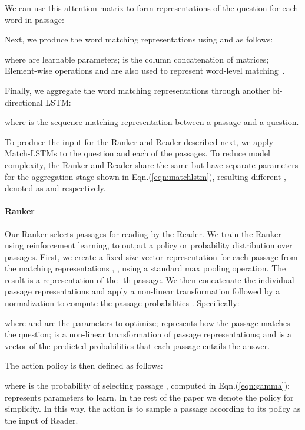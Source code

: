\documentclass[letterpaper]{article} \usepackage{aaai18}  \usepackage{times}  \usepackage{helvet}  \usepackage{courier}  \usepackage{url}  \usepackage{graphicx}  \usepackage{comment}
\begin{document}
We can use this attention matrix  to form representations of the question for each word in passage:





Next, we produce the word matching representations  using   and  as follows:


where  are learnable parameters;  is the column concatenation of matrices; Element-wise operations  and  are also used to represent word-level matching~\cite{wang2016compare,Chen:2017:ACL}.

Finally, we aggregate the word matching representations through another bi-directional LSTM:



where  is the sequence matching representation between a passage and a question.

To produce the input for the Ranker and Reader described next, we apply Match-LSTMs to the question and each of the passages.  To reduce model complexity, the Ranker and Reader share the same  but have separate parameters for the aggregation stage shown in Eqn.(\ref{eqn:matchlstm}), resulting different , denoted as  and  respectively.


\paragraph{Ranker}
Our Ranker selects passages for reading by the Reader.
We train the Ranker using reinforcement learning, to output a policy or probability distribution over passages. 
First, we create a fixed-size vector  representation for each passage from the matching representations  , , using a standard max pooling operation.  The result  is a representation of the -th passage. We then concatenate the individual passage representations and apply a non-linear transformation followed by a normalization to compute the passage probabilities .  Specifically:

where  and  are the parameters to optimize;  represents how the  passage matches the question;  is a non-linear transformation of passage representations; and  is a vector of the predicted probabilities that each passage entails the answer.

The action policy is then defined as follows:


where  is the probability of selecting passage , computed in Eqn.(\ref{eqn:gamma});  represents parameters to learn. In the rest of the paper we denote the policy  for simplicity. In this way, the action is to sample a passage according to its policy  as the input of Reader.
\end{document}
